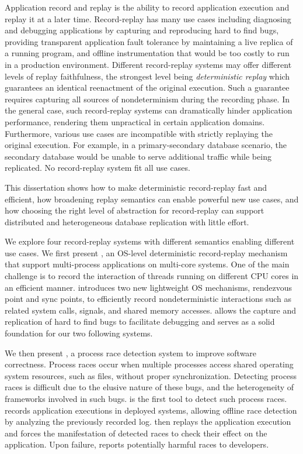 Application record and replay is the ability to record application execution and
replay it at a later time. Record-replay has many use cases including diagnosing and
debugging applications by capturing and reproducing hard to find bugs, providing
transparent application fault tolerance by maintaining a live replica of a running program,
and offline instrumentation that would be too costly to run in a production environment.
Different record-replay systems may offer different levels of replay faithfulness,
the strongest level being {\em deterministic replay} which guarantees an identical
reenactment of the original execution.
Such a guarantee requires capturing all sources of nondeterminism during the recording
phase. In the general case, such record-replay systems can dramatically hinder
application performance, rendering them unpractical in certain application domains.
Furthermore, various use cases are incompatible with strictly replaying the original execution.
For example, in a primary-secondary database scenario, the secondary database
would be unable to serve additional traffic while being replicated.
No record-replay system fit all use cases.

This dissertation shows how to make deterministic record-replay fast and
efficient, how broadening replay semantics can enable powerful new use cases,
and how choosing the right level of abstraction for record-replay can support
distributed and heterogeneous database replication with little effort.

We explore four record-replay systems with different semantics enabling different use cases.
We first present \scribe, an OS-level deterministic record-replay mechanism
that support multi-process applications on multi-core systems.
One of the main
challenge is to record the interaction of threads running on different CPU cores
in an efficient manner.
\scribe introduces two new lightweight OS mechanisms, rendezvous point and sync
points, to efficiently record nondeterministic interactions such as related
system calls, signals, and shared memory accesses. \scribe allows the capture
and replication of hard to find bugs to facilitate debugging and serves as a
solid foundation for our two following systems.

We then present \racepro, a process race detection system to improve
software correctness. Process races occur when multiple processes access shared
operating system resources, such as files, without proper synchronization.
Detecting process races is difficult due to the elusive nature of these bugs,
and the heterogeneity of frameworks involved in such bugs.
\racepro is the first tool to detect such process races.
\racepro records application executions in deployed systems, allowing offline
race detection by analyzing the previously recorded log. \racepro then replays
the application execution and forces the manifestation of detected races to check their
effect on the application. Upon failure, \racepro reports potentially harmful
races to developers.


